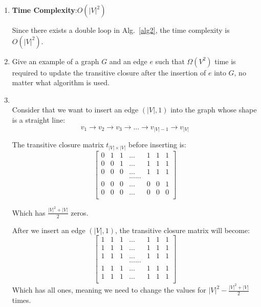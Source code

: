 \documentclass[12pt,a4paper]{article}
\makeatletter
\newtheorem*{solution}{Solution}
\theoremstyle{definition}
\renewenvironment{solution}[1][Solution] {\par\pushQED{\qed}\normalfont\topsep6\p@\@plus6\p@\relax\trivlist\item[\hskip\labelsep\bfseries#1\@addpunct{.}]\ignorespaces}{\popQED\endtrivlist\@endpefalse} \makeatother
\makeatother
\begin{document}
\begin{enumerate}
\begin{enumerate}
\begin{solution}
\begin{enumerate}
	   \end{enumerate}
	   
	   \textbf{Time Complexity}:$O(|V|^2)$
	   
	   Since there exists a double loop in Alg.~\ref{alg2}, the time complexity is $O(|V|^2)$.
	   
	   
	   
	   
	    \end{solution}
	    \item Give an example of a graph $G$ and an edge $e$ such that $\Omega(V^2)$ time is required to update the transitive closure after the insertion of $e$ into $G$, no matter what algorithm is used.
	    
	    \begin{solution}
~\\
        Consider that we want to insert an edge $(|V|,1)$ into the graph whose shape is a straight line:
        $$
        v_1 \rightarrow v_2 \rightarrow v_3 \rightarrow ... \rightarrow v_{|V|-1}\rightarrow v_{|V|}
        $$
        
        The transitive closure matrix $t_{|V|\times |V|}$ before inserting is:
        $$
        \begin{bmatrix}
        0 & 1&1 &...&1&1&1\\
        0 & 0&1 &...&1&1&1\\
        0 & 0&0 &...&1&1&1\\
        & & & ......& & &\\
        0 & 0&0 &...&0&0&1\\
        0 & 0&0 &...&0&0&0\\

        \end{bmatrix}
        $$
        
        Which has $\frac{|V|^2+|V|}{2}$ zeros.
        
        After we insert an edge $(|V|,1)$, the transitive closure matrix will become:
        $$
        \begin{bmatrix}
        1 & 1&1 &...&1&1&1\\
        1 & 1&1 &...&1&1&1\\
        1 & 1&1 &...&1&1&1\\
        & & & ......& & &\\
        1 & 1&1 &...&1&1&1\\
        1 & 1&1 &...&1&1&1\\
        \end{bmatrix}
        $$
        Which has all ones, meaning we need to change the values for $|V|^2-\frac{|V|^2+|V|}{2}$ times.
        

\end{solution}
\end{enumerate}
\end{enumerate}
\end{document}

